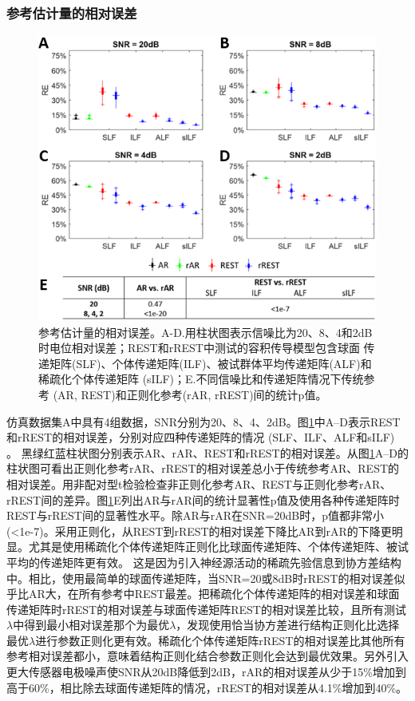 \subsubsection{参考估计量的相对误差}
\begin{figure}[!h]
	\includegraphics[width=15cm]{pic/Frontier/figure4.png}
	\caption{参考估计量的相对误差。A-D.用柱状图表示信噪比为20、8、4和2dB时电位相对误差；REST和rREST中测试的容积传导模型包含球面
	传递矩阵(SLF)、个体传递矩阵(ILF)、被试群体平均传递矩阵(ALF)和稀疏化个体传递矩阵 (sILF)；E.不同信噪比和传递矩阵情况下传统参考
	(AR, REST)和正则化参考(rAR, rREST)间的统计p值。}
	\label{3:4}
\end{figure}
仿真数据集A中具有4组数据，SNR分别为20、8、4、2dB。图\ref{3:4}中A–D表示REST和rREST的相对误差，分别对应四种传递矩阵的情况 (SLF、ILF、ALF和sILF) 。 黑绿红蓝柱状图分别表示AR、rAR、REST和rREST的相对误差。从图\ref{3:4}A–D的柱状图可看出正则化参考rAR、rREST的相对误差总小于传统参考AR、REST的相对误差。用非配对型t检验检查非正则化参考AR、REST与正则化参考rAR、rREST间的差异。图\ref{3:4}E列出AR与rAR间的统计显著性p值及使用各种传递矩阵时REST与rREST间的显著性水平。除AR与rAR在SNR=20dB时，p值都非常小(<1e-7)。采用正则化，从REST到rREST的相对误差下降比AR到rAR的下降更明显。尤其是使用稀疏化个体传递矩阵正则化比球面传递矩阵、个体传递矩阵、被试平均的传递矩阵更有效。 这是因为引入神经源活动的稀疏先验信息到协方差结构中。相比，使用最简单的球面传递矩阵，当SNR=20或8dB时rREST的相对误差似乎比AR大，在所有参考中REST最差。把稀疏化个体传递矩阵的相对误差和球面传递矩阵时rREST的相对误差与球面传递矩阵REST的相对误差比较，且所有测试$\lambda$中得到最小相对误差那个为最优$\lambda$，发现使用恰当协方差进行结构正则化比选择最优$\lambda$进行参数正则化更有效。稀疏化个体传递矩阵rREST的相对误差比其他所有参考相对误差都小，意味着结构正则化结合参数正则化会达到最优效果。另外引入更大传感器电极噪声使SNR从20dB降低到2dB，rAR的相对误差从少于15\%增加到高于60\%，相比除去球面传递矩阵的情况，rREST的相对误差从4.1\%增加到40\%。
